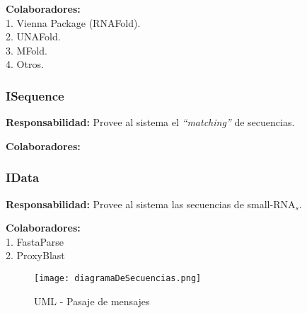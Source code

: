 \par \textbf{Colaboradores:} \\
\hspace*{3.75cm} 1. Vienna Package (RNAFold). \\
\hspace*{3.75cm} 2. UNAFold. \\
\hspace*{3.75cm} 3. MFold. \\
\hspace*{3.75cm} 4. Otros.

\subsubsection{ISequence}
\par \textbf{Responsabilidad:} Provee al sistema el \emph{``matching''} de secuencias.
	
\par \textbf{Colaboradores:} 

\subsubsection{IData}
\par \textbf{Responsabilidad:} Provee al sistema las secuencias de small-RNA$_s$.

\par \textbf{Colaboradores:} \\
\hspace*{3.75cm} 1. FastaParse \\
\hspace*{3.75cm} 2. ProxyBlast \\

\begin{figure}
  \centering
  \texttt{[image: diagramaDeSecuencias.png]}  
  \caption{UML - Pasaje de mensajes}
  \label{mensajes}
\end{figure}

